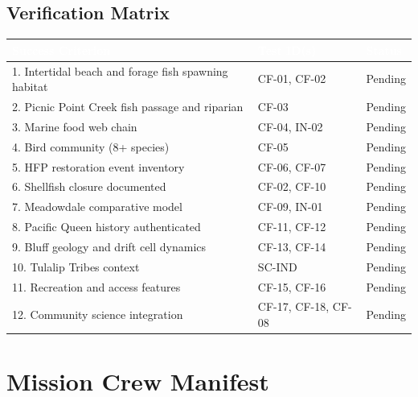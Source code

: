 \documentclass[11pt,letterpaper]{article}
\newcommand{\tableheader}[1]{\textbf{\sffamily\textcolor{white}{#1}}}
\begin{document}
\subsection{Verification Matrix}

\begin{center}
\begin{tabularx}{\textwidth}{XL{3.5cm}C{1.5cm}}
\toprule
{}
\tableheader{Success Criterion} & \tableheader{Test ID(s)} & \tableheader{Status} \\
. Intertidal beach and forage fish spawning habitat & CF-01, CF-02 & Pending \\
2. Picnic Point Creek fish passage and riparian & CF-03 & Pending \\
3. Marine food web chain & CF-04, IN-02 & Pending \\
4. Bird community (8+ species) & CF-05 & Pending \\
5. HFP restoration event inventory & CF-06, CF-07 & Pending \\
6. Shellfish closure documented & CF-02, CF-10 & Pending \\
7. Meadowdale comparative model & CF-09, IN-01 & Pending \\
8. Pacific Queen history authenticated & CF-11, CF-12 & Pending \\
9. Bluff geology and drift cell dynamics & CF-13, CF-14 & Pending \\
10. Tulalip Tribes context & SC-IND & Pending \\
11. Recreation and access features & CF-15, CF-16 & Pending \\
12. Community science integration & CF-17, CF-18, CF-08 & Pending \\
\bottomrule
\end{tabularx}
\end{center}

\section{Mission Crew Manifest}
\end{document}
